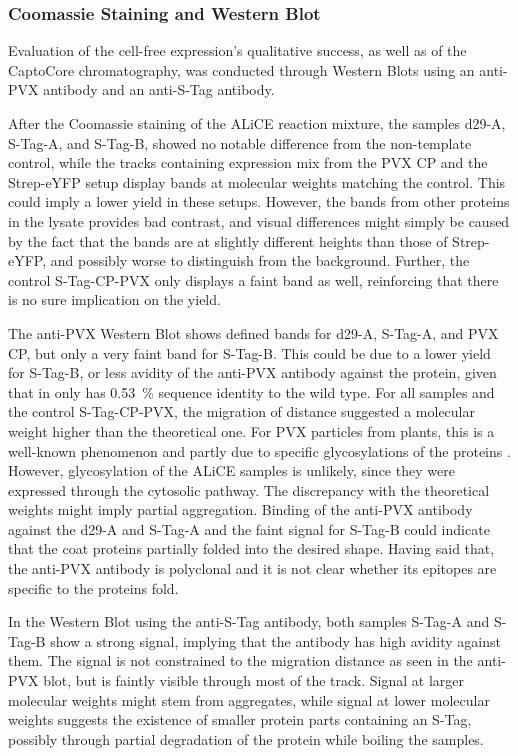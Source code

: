 \subsubsection{Coomassie Staining and Western Blot}
Evaluation of the cell-free expression's qualitative success, as well as of the CaptoCore chromatography, was conducted through Western Blots using an anti-PVX antibody and an anti-S-Tag antibody.

After the Coomassie staining of the ALiCE reaction mixture, the samples d29-A, S-Tag-A, and S-Tag-B, showed no notable difference from the non-template control, while the tracks containing expression mix from the PVX CP and the Strep-eYFP setup display bands at molecular weights matching the control. This could imply a lower yield in these setups. However, the bands from other proteins in the lysate provides bad contrast, and visual differences might simply be caused by the fact that the bands are at slightly different heights than those of Strep-eYFP, and possibly worse to distinguish from the background. Further, the control S-Tag-CP-PVX only displays a faint band as well, reinforcing that there is no sure implication on the yield. 

The anti-PVX Western Blot shows defined bands for d29-A, S-Tag-A, and PVX CP, but only a very faint band for S-Tag-B. This could be due to a lower yield for S-Tag-B, or less avidity of the anti-PVX antibody against the protein, given that in only has \SI{0.53}{\percent} sequence identity to the wild type. For all samples and the control S-Tag-CP-PVX, the migration of distance suggested a molecular weight higher than the theoretical one. For PVX particles from plants, this is a well-known phenomenon and partly due to specific glycosylations of the proteins \cite{pvx_glycosylation}. However, glycosylation of the ALiCE samples is unlikely, since they were expressed through the cytosolic pathway. The discrepancy with the theoretical weights might imply partial aggregation. Binding of the anti-PVX antibody against the d29-A and S-Tag-A and the faint signal for S-Tag-B could indicate that the coat proteins partially folded into the desired shape. Having said that, the anti-PVX antibody is polyclonal and it is not clear whether its epitopes are specific to the proteins fold. 

In the Western Blot using the anti-S-Tag antibody, both samples S-Tag-A and S-Tag-B show a strong signal, implying that the antibody has high avidity against them. The signal is not constrained to the migration distance as seen in the anti-PVX blot, but is faintly visible through most of the track. Signal at larger molecular weights might stem from aggregates, while signal at lower molecular weights suggests the existence of smaller protein parts containing an S-Tag, possibly through partial degradation of the protein while boiling the samples. 

